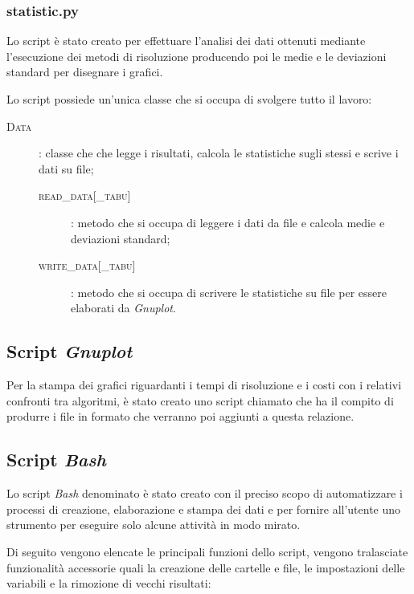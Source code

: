 \subsubsection{statistic.py}
Lo script  è stato creato per effettuare l'analisi dei dati ottenuti mediante l'esecuzione dei metodi di risoluzione producendo poi le medie e le deviazioni standard per disegnare i grafici.

Lo script possiede un'unica classe che si occupa di svolgere tutto il lavoro:
\begin{description}
	\item[\textsc{Data}]: classe che che legge i risultati, calcola le statistiche sugli stessi e scrive i dati su file;
	\begin{description}
		\item[\textsc{read\_data[\_tabu]}]: metodo che si occupa di leggere i dati da file e calcola medie e deviazioni standard;
		\item[\textsc{write\_data[\_tabu]}]: metodo che si occupa di scrivere le statistiche su file per essere elaborati da \emph{Gnuplot}.
	\end{description}
\end{description}

\subsection{Script \emph{Gnuplot}}
Per la stampa dei grafici riguardanti i tempi di risoluzione e i costi con i relativi confronti tra algoritmi, è stato creato uno script chiamato  che ha il compito di produrre i file in formato  che verranno poi aggiunti a questa relazione.

\subsection{Script \emph{Bash}}
\label{sec:bash}
Lo script \emph{Bash} denominato  è stato creato con il preciso scopo di automatizzare i processi di creazione, elaborazione e stampa dei dati e per fornire all'utente uno strumento per eseguire solo alcune attività in modo mirato.

Di seguito vengono elencate le principali funzioni dello script, vengono tralasciate funzionalità accessorie quali la creazione delle cartelle e file, le impostazioni delle variabili e la rimozione di vecchi risultati:

